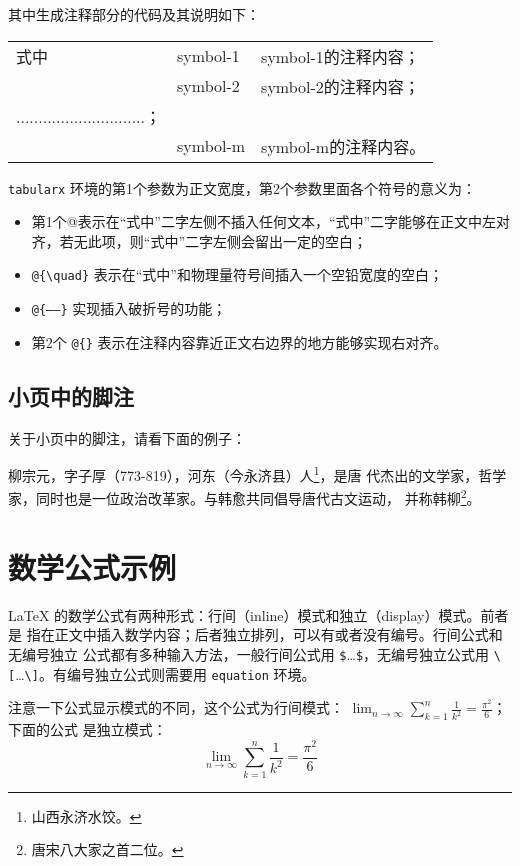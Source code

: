 其中生成注释部分的代码及其说明如下：
\begin{latex}
\begin{tabularx}{\textwidth}{@{}l@{\quad}l@{——}X@{}}
式中 & symbol-1 & symbol-1的注释内容；\\
     & symbol-2 & symbol-2的注释内容；\\
     .............................；\\
     & symbol-m & symbol-m的注释内容。
\end{tabularx}
\end{latex}

\texttt{tabularx} 环境的第1个参数为正文宽度，第2个参数里面各个符号的意义为：
\begin{itemize}
\item 第1个@{}表示在“式中”二字左侧不插入任何文本，“式中”二字能够在正文中左对
齐，若无此项，则“式中”二字左侧会留出一定的空白；
\item \verb|@{\quad}| 表示在“式中”和物理量符号间插入一个空铅宽度的空白；
\item \verb|@{——}| 实现插入破折号的功能；
\item 第2个 \verb|@{}| 表示在注释内容靠近正文右边界的地方能够实现右对齐。
\end{itemize}

\subsection{小页中的脚注}

关于小页中的脚注，请看下面的例子：
 
\begin{minipage}[t]{\linewidth-\parindent}
柳宗元，字子厚（773-819），河东（今永济县）人\footnote{山西永济水饺。}，是唐
代杰出的文学家，哲学家，同时也是一位政治改革家。与韩愈共同倡导唐代古文运动，
并称韩柳\footnote{唐宋八大家之首二位。}。
\end{minipage}

\section{数学公式示例}
\label{sec:equation}

\LaTeX{} 的数学公式有两种形式：行间（inline）模式和独立（display）模式。前者是
指在正文中插入数学内容；后者独立排列，可以有或者没有编号。行间公式和无编号独立
公式都有多种输入方法，一般行间公式用 \verb|$|\ldots \verb|$|，无编号独立公式用
\verb|\[|\ldots \verb|\]|。有编号独立公式则需要用 \texttt{equation} 环境。

注意一下公式显示模式的不同，这个公式为行间模式：
$\lim_{n \to \infty} \sum_{k=1}^n \frac{1}{k^2} = \frac{\pi^2}{6}$；下面的公式
是独立模式：
\[\lim_{n \to \infty} \sum_{k=1}^n \frac{1}{k^2} = \frac{\pi^2}{6}\]

